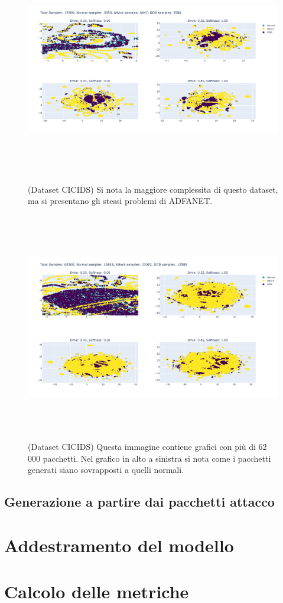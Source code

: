 \begin{figure}[htpb]
    \centering
    \includegraphics[width=\textwidth,height=10cm,keepaspectratio=true]{img/gen_test/cicids/CICIDS18_normal_only_25p_ood.png}
    \caption{
      (Dataset CICIDS) Si nota la maggiore complessita di questo dataset, ma si presentano gli stessi problemi di ADFANET.
    }
    \label{fig:gen_CICIDS_norm_1}
\end{figure}


\begin{figure}[htpb]
    \centering
    \includegraphics[width=\textwidth,height=10cm,keepaspectratio=true]{img/gen_test/cicids/CICIDS18_normal_only_12k_ood.png}
    \caption{
      (Dataset CICIDS) Questa immagine contiene grafici con più di 62 000 pacchetti. Nel grafico in alto a sinistra si nota come i pacchetti generati siano sovrapposti a quelli normali.
    }
    \label{fig:gen_CICIDS_norm_2}
\end{figure}




\subsection{Generazione a partire dai pacchetti attacco}



\section{Addestramento del modello}

\section{Calcolo delle metriche}


